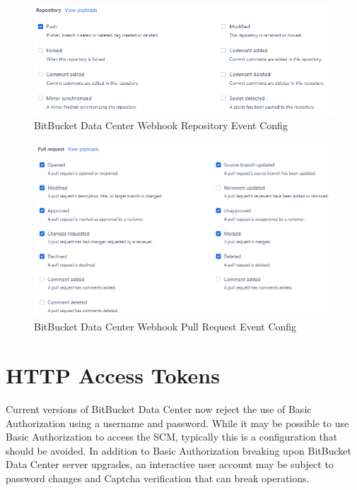\begin{figure}[ht]
    \includegraphics[width=\textwidth]{graphics/bbdc-repository-event-config.png}
    \caption{BitBucket Data Center Webhook Repository Event Config}
    \label{fig:bbdc-repo-event-config}
\end{figure}

\begin{figure}[ht]
    \includegraphics[width=\textwidth]{graphics/bbdc-pr-event-config.png}
    \caption{BitBucket Data Center Webhook Pull Request Event Config}
    \label{fig:bbdc-pr-event-config}
\end{figure}


\section{\cxoneflowtext\space HTTP Access Tokens}

Current versions of BitBucket Data Center now reject the use of Basic Authorization using
a username and password. While it may be possible to use Basic Authorization to access the SCM, typically
this is a configuration that should be avoided.  In addition to Basic Authorization breaking upon BitBucket Data Center
server upgrades, an interactive user account may be subject to password changes and Captcha verification that
can break \cxoneflow operations.  

